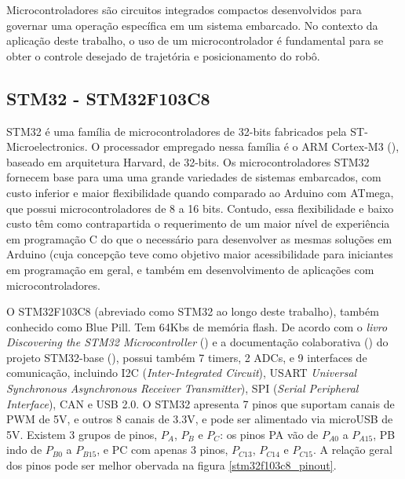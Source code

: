 

Microcontroladores são circuitos integrados compactos desenvolvidos para governar
uma operação específica em um sistema embarcado. No contexto da aplicação deste
trabalho, o uso de um microcontrolador é fundamental para se obter o controle
desejado de trajetória e posicionamento do robô.

\subsection{STM32 - STM32F103C8}

STM32 é uma família de microcontroladores de 32-bits fabricados pela
ST-Microelectronics. O processador empregado nessa família é o ARM Cortex-M3 (\cite{cortex_m3}),
baseado em arquitetura Harvard, de 32-bits. Os microcontroladores STM32 fornecem
base para uma uma grande variedades de sistemas embarcados, com custo inferior
e maior flexibilidade quando comparado ao Arduino com ATmega, que possui
microcontroladores de 8 a 16 bits. Contudo, essa flexibilidade e baixo custo têm
como contrapartida o requerimento de um maior nível de experiência em
programação C do que o necessário para desenvolver as mesmas soluções em
Arduino (cuja concepção teve como objetivo maior acessibilidade para iniciantes
em programação em geral, e também  em desenvolvimento de aplicações com
microcontroladores.

O STM32F103C8 (abreviado como STM32 ao longo deste trabalho),
também conhecido como Blue Pill. Tem 64Kbs de memória flash.  De acordo com o \textit{livro Discovering the STM32 Microcontroller} (\cite{stm_doc}) e 
a documentação colaborativa (\cite{stm32_base_org}) do projeto STM32-base (\cite{stm32_base}),
possui também 7 timers, 2 ADCs, e 9 interfaces de comunicação, incluindo I2C (\textit{Inter-Integrated Circuit}), USART 
\textit{Universal Synchronous Asynchronous Receiver Transmitter}), SPI (\textit{Serial Peripheral Interface}), CAN e
USB 2.0. O STM32 apresenta 7 pinos que suportam canais de PWM de 5V, e outros 8 canais de 3.3V, e pode ser alimentado
via microUSB de 5V. Existem 3 grupos de pinos,  $P_{A}$,  $P_{B}$ e  $P_{C}$: os pinos PA vão de $P_{A0}$ 
a $P_{A15}$, PB indo de $P_{B0}$ a $P_{B15}$, e PC com apenas 3 pinos, $P_{C13}$, $P_{C14}$ e $P_{C15}$.
A relação geral dos pinos pode ser melhor obervada na figura \ref{stm32f103c8_pinout}.

